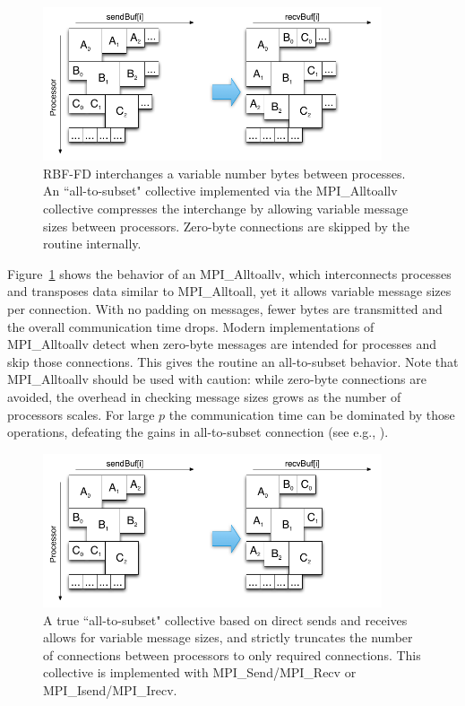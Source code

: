 \documentclass{report}
\begin{document}
\begin{figure}
\centering
\includegraphics[width=10cm]{../figures/omnigraffle/MPI_Alltoallv_Visual.png}
\caption{RBF-FD interchanges a variable number bytes between processes. An ``all-to-subset" collective implemented via the MPI\_Alltoallv collective compresses the interchange by allowing variable message sizes between processors. Zero-byte connections are skipped by the routine internally.}
\label{fig:mpi_alltoallv_visual}
\end{figure}

Figure~\ref{fig:mpi_alltoallv_visual} shows the behavior of an MPI\_Alltoallv, which interconnects processes and transposes data similar to MPI\_Alltoall, yet it allows variable message sizes per connection. With no padding on messages, fewer bytes are transmitted and the overall communication time drops. Modern implementations of MPI\_Alltoallv detect when zero-byte messages are intended for processes and skip those connections. This gives the routine an all-to-subset behavior. Note that MPI\_Alltoallv should be used with caution: while zero-byte connections are avoided, the overhead in checking message sizes grows as the number of processors scales. For large $p$ the communication time can be dominated by those operations, defeating the gains in all-to-subset connection (see e.g., \cite{Balaji2010}). 


\begin{figure}
\centering
\includegraphics[width=10cm]{../figures/omnigraffle/MPI_IsendIrecv_Visual.png}
\caption{A true ``all-to-subset" collective based on direct sends and receives allows for variable message sizes, and strictly truncates the number of connections between processors to only required connections. This collective is implemented with MPI\_Send/MPI\_Recv or MPI\_Isend/MPI\_Irecv.}
\label{fig:mpi_isendirecv_visual}
\end{figure}
\end{document}
